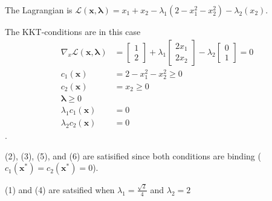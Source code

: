 
The Lagrangian is $\mathcal{L}(\mathbf{x, \lambda}) = x_1 + x_2 - \lambda_1(2 - x_1^2 - x_2^2) - \lambda_2(x_2)$.

The KKT-conditions are in this case \begin{align}
  \nabla _x \mathcal{L}(\mathbf{x, \lambda}) &= 
  \begin{bmatrix}
    1 \\ 2  
  \end{bmatrix}
  + \lambda_1
  \begin{bmatrix}
    2x_1 \\ 2x_2
  \end{bmatrix}
  - \lambda_2
  \begin{bmatrix}
    0 \\ 1
  \end{bmatrix}
  = 0
  \\
  c_1(\mathbf{x}) &= 2-x_1^2 - x_2^2 \geq 0 \\
  c_2(\mathbf{x}) &= x_2 \geq 0 \\
  \mathbf{\lambda} \geq 0 \\
  \lambda_1c_1(\mathbf{x}) &= 0 \\
  \lambda_2c_2(\mathbf{x}) &= 0
\end{align}.

(2), (3), (5), and (6) are satisified since both conditions are binding ($c_1(\mathbf{x^*}) = c_2(\mathbf{x^*}) = 0$).

(1) and (4) are satsified when $\lambda_1 = \frac{\sqrt{2}}{4}$ and $\lambda_2 = 2$
